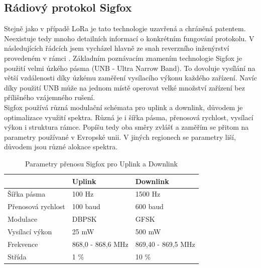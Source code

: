 \documentclass{ctuthesis}
\begin{document}
\subsection{Rádiový protokol Sigfox}
Stejně jako v případě LoRa je tato technologie uzavřená a chráněná patentem. Neexistuje tedy mnoho detailních informací o konkrétním fungování protokolu. V následujících řádcích jsem vycházel hlavně ze snah reverzního inženýrství provedeném v rámci \cite{sigfoxprotocol}.
Základním poznávacím znamením technologie Sigfox je použití velmi úzkého pásma (UNB - Ultra Narrow Band). To dovoluje vysílání na větší vzdálenosti díky úzkému zaměření vysílacího výkonu každého zařízení. Navíc díky použití UNB může na jednom místě operovat velké množství zařízení bez přílišného vzájemného rušení. \\
Sigfox používá různá modulační schémata pro uplink a downlink, důvodem je optimalizace využití spektra. Různá je i šířka pásma, přenosová rychlost, vysílací výkon i struktura rámce. Popíšu tedy oba směry zvlášť a zaměřím se přitom na parametry používané v Evropské unii. V jiných regionech se parametry liší, důvodem jsou různé alokace spektra.

\begin{table}[]
\begin{tabular}{@{}ll|l@{}}
\toprule
                   & Uplink            & Downlink           \\ \midrule
Šířka pásma        & 100 Hz            & 1500 Hz            \\
Přenosová rychlost & 100 baud          & 600 baud           \\
Modulace           & DBPSK             & GFSK               \\
Vysílací výkon     & 25 mW             & 500 mW             \\
Frekvence          & 868,0 - 868,6 MHz & 869,40 - 869,5 MHz \\
Střída             & 1 \%              & 10 \%             
\end{tabular}
\caption{Parametry přenosu Sigfox pro Uplink a Downlink}
\label{tab:upAndDown}
\cite{sigfoxsystem}
\end{table}
\end{document}
